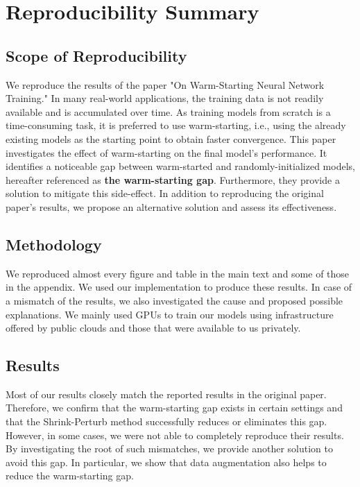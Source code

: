 \section*{\centering Reproducibility Summary}

\subsection*{Scope of Reproducibility}
 

We reproduce the results of the paper "On Warm-Starting Neural Network Training." In many real-world applications, the training data is not readily available and is accumulated over time. As training models from scratch is a time-consuming task, it is preferred to use warm-starting, i.e., using the already existing models as the starting point to obtain faster convergence. This paper investigates the effect of warm-starting on the final model's performance. It identifies a noticeable gap between warm-started and randomly-initialized models, hereafter referenced as \textbf{the warm-starting gap}. Furthermore, they provide a solution to mitigate this side-effect. In addition to reproducing the original paper's results, we propose an alternative solution and assess its effectiveness.

\subsection*{Methodology}
We reproduced almost every figure and table in the main text and some of those in the appendix. We used our implementation to produce these results. In case of a mismatch of the results, we also investigated the cause and proposed possible explanations. We mainly used GPUs to train our models using infrastructure offered by public clouds and those that were available to us privately. 

\subsection*{Results}

Most of our results closely match the reported results in the original paper. Therefore, we confirm that the warm-starting gap exists in certain settings and that the Shrink-Perturb method successfully reduces or eliminates this gap. However, in some cases, we were not able to completely reproduce their results. By investigating the root of such mismatches, we provide another solution to avoid this gap. In particular, we show that data augmentation also helps to reduce the warm-starting gap.

